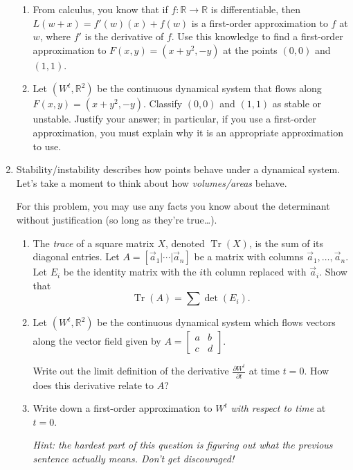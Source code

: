 \documentclass[letter]{article}
\newcommand{\R}{\mathbb{R}}
\newcommand{\mat}[1]{\begin{bmatrix}#1\end{bmatrix}}
\DeclareMathOperator{\Tr}{Tr}
\begin{document}
\begin{enumerate}
\begin{enumerate}
				\item From calculus, you know that if $f:\R\to\R$ is differentiable, then $L(w+x)=f'(w)(x)+f(w)$ is a
					first-order approximation to $f$ at $w$, where $f'$ is the derivative of $f$. Use this knowledge
					to find a first-order approximation to $F(x,y) = (x+y^2,-y)$ at the points $(0,0)$ and $(1,1)$.
				\item Let $(W^t,\R^2)$ be the continuous dynamical system that flows along $F(x,y)=(x+y^2,-y)$.
					Classify $(0,0)$ and $(1,1)$ as stable or unstable. Justify your answer; in particular, if you use a
					first-order approximation, you must explain why it is an appropriate approximation to use. 
			\end{enumerate}
		\item Stability/instability describes how points behave under a dynamical system. Let's take a moment to think about
			how \emph{volumes/areas} behave.

			For this problem, you may use any facts you know about the determinant without justification (so long as they're true\ldots).

			\begin{enumerate}
				\item The \emph{trace} of a square matrix $X$, denoted $\Tr(X)$,
					is the sum of its diagonal entries. Let $A=[\vec a_1|\cdots|\vec a_n]$
					be a matrix with columns $\vec a_1,\ldots,\vec a_n$.  Let $E_i$ be the identity matrix with
					the $i$th column replaced with $\vec a_i$. Show that
					\[
						\Tr(A) = \sum \det(E_i).
					\]
				\item Let $(W^t,\R^2)$ be the continuous dynamical system which flows vectors along the vector field given
					by $A=\mat{a&b\\c&d}$.

					Write out the limit definition of the derivative $\frac{\partial W^t}{\partial t}$ at time $t=0$.
					How does this derivative relate to $A$?
				\item Write down a first-order approximation to $W^t$ \emph{with respect to time} at $t=0$.

					\emph{Hint: the hardest part of this question is figuring out what the previous sentence actually
					means. Don't get discouraged!}



\end{enumerate}
\end{enumerate}
\end{document}

